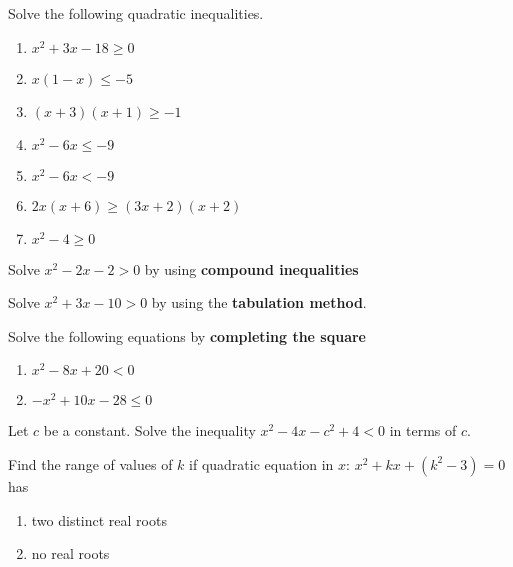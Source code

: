 \documentclass[addpoints, 10pt]{exam}
\begin{document}
\begin{questions}
	\question
	Solve the following quadratic inequalities.
	\begin{multicols}{3}
		\begin{enumerate}[label=(\alph*)]
			\item $x^2+3x-18 \geq 0$
			\item $x(1-x) \leq -5$
			\item $(x+3)(x+1) \geq -1$
			\item $x^2-6x \leq -9$
			\item $x^2-6x < -9$
			\item $2x(x+6) \geq (3x+2)(x+2)$
			\item $x^2-4 \geq 0$
		\end{enumerate}
	\end{multicols}
	\begin{solutionorlines}[16cm]
	\end{solutionorlines}
	\newpage
	\question
	Solve $x^2-2x-2>0$ by using \textbf{compound inequalities}
	\begin{solutionorlines}[10cm]
	\end{solutionorlines}
	\question
	Solve $x^2+3x-10>0$ by using the \textbf{tabulation method}.
	\begin{solutionorlines}[10cm]
	\end{solutionorlines}
	\newpage
	\question
	Solve the following equations by \textbf{completing the square}
	\begin{multicols}{2}
		\begin{enumerate}[label=(\alph*)]
			\item $x^2-8x+20<0$
			\item $-x^2+10x-28\leq 0$
		\end{enumerate}
	\end{multicols}
	\begin{solutionorlines}[10cm]
	\end{solutionorlines}
	\question Let $c$ be a constant. Solve the inequality $x^2-4x-c^2+4<0$ in terms of $c$.
	\begin{solutionorlines}[9cm]
	\end{solutionorlines}
	\newpage
	\question
	Find the range of values of $k$ if quadratic equation in $x$: $x^2+kx+(k^2-3)=0$ has
	\begin{multicols}{2}
		\begin{enumerate}[label=(\alph*)]
			\item two distinct real roots 
			\item no real roots
		\end{enumerate}
	\end{multicols}
	\begin{solutionorlines}[9cm]
	\end{solutionorlines}
	

\end{questions}
\end{document}
